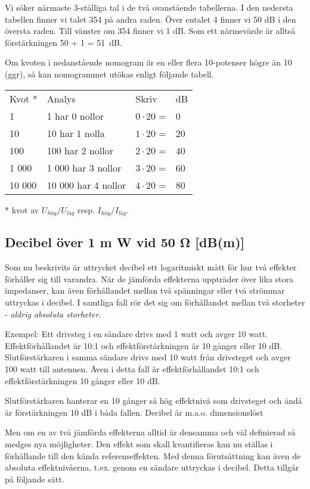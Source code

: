 Vi söker närmaste 3-ställiga tal i de två ovanstående tabellerna. I
den nedersta tabellen finner vi talet 354 på andra raden.  Över
entalet 4 finner vi 50 dB i den översta raden. Till vänster om 354
finner vi 1 dB.  Som ett närmevärde är alltså förstärkningen 50 + 1 =
51~dB.

Om kvoten i nedanstående nomogram är en eller flera 10-potenser högre
än 10 (ggr), så kan nomogrammet utökas enligt följande tabell.

\begin{tabular}{llll}
  Kvot * & Analys              & Skriv           & dB \\
  1      & 1 har 0 nollor      & \(0 \cdot 20\) = & 0  \\
  10     & 10 har 1 nolla      & \(1 \cdot 20\) = & 20 \\
  100    & 100 har 2 nollor    & \(2 \cdot 20\) = & 40 \\
  1 000  & 1 000 har 3 nollor  & \(3 \cdot 20\) = & 60 \\
  10 000 & 10 000 har 4 nollor & \(4 \cdot 20\) = & 80 \\
\end{tabular}

* kvot av \(U_{hög}/U_{låg}\) resp. \(I_{hög}/I_{låg}\).

\subsection{Decibel över 1 m W vid 50 Ω [dB(m)]}
Som nu beskrivits är uttrycket decibel ett logaritmiskt mått för hur
två effekter förhåller sig till varandra. När de jämförda effekterna
uppträder över lika stora impedanser, kan även förhållandet mellan två
spänningar eller två strömmar uttryckas i decibel. I samtliga fall rör
det sig om förhållandet mellan två storheter - \emph{aldrig absoluta
  storheter}.

Exempel: Ett drivsteg i en sändare drivs med 1 watt och avger 10
watt. Effektförhållandet är 10:1 och effektförstärkningen är 10 gånger
eller 10 dB. Slutförstärkaren i samma sändare drivs med 10 watt från
drivsteget och avger 100 watt till antennen. Även i detta fall är
effektförhållandet 10:1 och effektförstärkningen 10 gånger eller 10
dB.

Slutförstärkaren hanterar en 10 gånger så hög effektnivå som
drivsteget och ändå är förstärkningen 10 dB i båda fallen. Decibel är
m.a.o. dimensionslöst

Men om en av två jämförda effekterna alltid är densamma och väl
definierad så medges nya möjligheter. Den effekt som skall
kvantifieras kan nu ställas i förhållande till den kända
referenseffekten. Med denna förutsättning kan även de absoluta
effektnivåerna, t.ex. genom en sändare uttryckas i decibel. Detta
tillgår på följande sätt.

